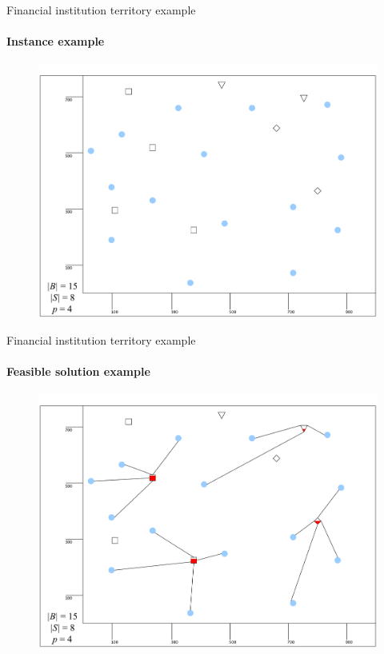 \documentclass{beamer}
\begin{document}
\begin{frame}{Financial institution territory example}
    \framesubtitle{Instance example}
    \begin{figure}
        \centering
        \includegraphics[scale=0.08]{instancia_dpi.pdf}
        \label{fig:instancia}
    \end{figure}
\end{frame}

\begin{frame}{Financial institution territory example}
    \framesubtitle{Feasible solution example}
    \begin{figure}
        \centering
        \includegraphics[scale=0.08]{solucion_buena_dpi.pdf}
        \label{fig:instancia}
    \end{figure}
\end{frame}
\end{document}
